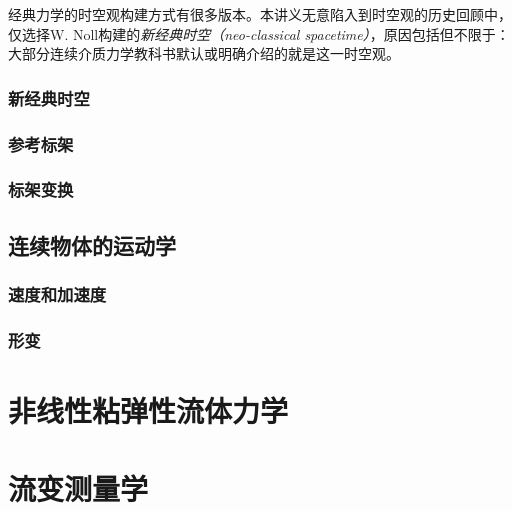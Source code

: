 \documentclass[zihao=-4,linespread=1.5,a4paper,heading=true,twoside]{ctexbook}
\theoremstyle{definition}
\theoremstyle{plain}
\begin{document}
经典力学的时空观构建方式有很多版本\cite{Weatherall2022}。本讲义无意陷入到时空观的历史回顾中，仅选择W. Noll\cite{Noll1973}构建的\emph{新经典时空（neo-classical spacetime）}，原因包括但不限于：大部分连续介质力学教科书默认或明确介绍的就是这一时空观。
\section{新经典时空}\label{sec:III.5.1}

\section{参考标架}\label{sec:III.5.2}

\section{标架变换}\label{sec:III.5.3}


\chapter{连续物体的运动学}\label{sec:III.6}
\section{速度和加速度}\label{sec:III.6.1}

\section{形变}\label{sec:III.6.2}


\part{非线性粘弹性流体力学}
\part{流变测量学}


%

%

%
\end{document}
